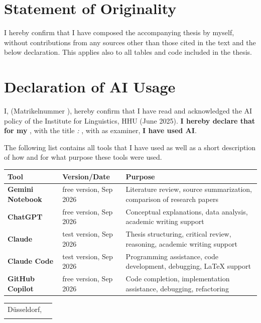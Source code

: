 \clearpage
{}
\section*{Statement of Originality}
I hereby confirm that I have composed the accompanying thesis by myself, without contributions from any sources other than those cited in the text and the below declaration.
This applies also to all tables and code included in the thesis.

\vspace{5mm}

{}
\section*{Declaration of AI Usage}
I, \thesisauthor{} (Matrikelnummer \thesisstudentid), hereby confirm that I have read and acknowledged the AI policy of the Institute for Linguistics, HHU (June 2025).
\textbf{I hereby declare that for my \thesisprogramme{} \thesistype{}}, with the title \emph{\thesistitle: \thesissubtitle}, with \thesisfirstexaminer{} as examiner, \textbf{I have used AI}.

The following list contains all tools that I have used as well as a short description of how and for what purpose these tools were used.

\vspace{5mm}

\begin{center}
	\begin{tabular}{|P{2cm}|P{2cm}|P{7cm}|}
		\hline
		\textbf{Tool}            & \textbf{Version/Date}  & \textbf{Purpose}                                                         \\
		\hline
		\textbf{Gemini Notebook} & free version, Sep 2026 & Literature review, source summarization, comparison of research papers   \\
		\hline
		\textbf{ChatGPT}         & free version, Sep 2026 & Conceptual explanations, data analysis, academic writing support         \\
		\hline
		\textbf{Claude}          & test version, Sep 2026 & Thesis structuring, critical review, reasoning, academic writing support \\
		\hline
		\textbf{Claude Code}     & test version, Sep 2026 & Programming assistance, code development, debugging, LaTeX support       \\
		\hline
		\textbf{GitHub Copilot}  & free version, Sep 2026 & Code completion, implementation assistance, debugging, refactoring       \\
		\hline
	\end{tabular}
\end{center}

\vspace{10mm}
\noindent
\begin{tabular}{lc}
	Düsseldorf, \thesisdate
	\hspace*{.5cm}
	 & \underline{\hspace{6cm}} \\
	 & \thesisauthor
\end{tabular}\par
